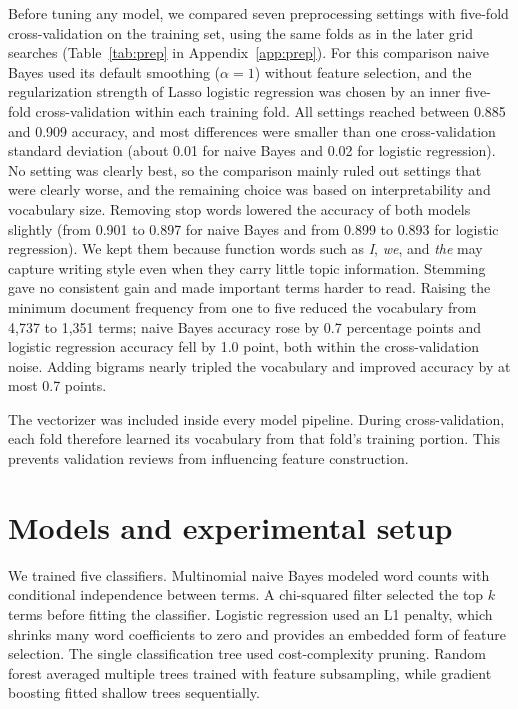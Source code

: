 \documentclass[onecolumn]{jmlr}
\begin{document}
Before tuning any model, we compared seven preprocessing settings with five-fold cross-validation on the training set, using the same folds as in the later grid searches (Table~\ref{tab:prep} in Appendix~\ref{app:prep}). For this comparison naive Bayes used its default smoothing ($\alpha=1$) without feature selection, and the regularization strength of Lasso logistic regression was chosen by an inner five-fold cross-validation within each training fold. All settings reached between 0.885 and 0.909 accuracy, and most differences were smaller than one cross-validation standard deviation (about 0.01 for naive Bayes and 0.02 for logistic regression). No setting was clearly best, so the comparison mainly ruled out settings that were clearly worse, and the remaining choice was based on interpretability and vocabulary size. Removing stop words lowered the accuracy of both models slightly (from 0.901 to 0.897 for naive Bayes and from 0.899 to 0.893 for logistic regression). We kept them because function words such as \emph{I}, \emph{we}, and \emph{the} may capture writing style even when they carry little topic information. Stemming gave no consistent gain and made important terms harder to read. Raising the minimum document frequency from one to five reduced the vocabulary from 4,737 to 1,351 terms; naive Bayes accuracy rose by 0.7 percentage points and logistic regression accuracy fell by 1.0 point, both within the cross-validation noise. Adding bigrams nearly tripled the vocabulary and improved accuracy by at most 0.7 points.

The vectorizer was included inside every model pipeline. During cross-validation, each fold therefore learned its vocabulary from that fold's training portion. This prevents validation reviews from influencing feature construction.

\section{Models and experimental setup}

We trained five classifiers. Multinomial naive Bayes modeled word counts with conditional independence between terms. A chi-squared filter selected the top $k$ terms before fitting the classifier. Logistic regression used an L1 penalty, which shrinks many word coefficients to zero and provides an embedded form of feature selection. The single classification tree used cost-complexity pruning. Random forest averaged multiple trees trained with feature subsampling, while gradient boosting fitted shallow trees sequentially.
\end{document}
